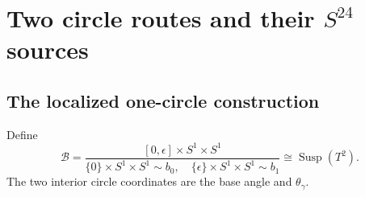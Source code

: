 \documentclass[11pt,letterpaper]{article}
\numberwithin{equation}{section}
\theoremstyle{definition}
\theoremstyle{remark}
\newcommand{\Susp}{\operatorname{Susp}}
\begin{document}
\section{Two circle routes and their \texorpdfstring{$S^{24}$}{S24} sources}

\subsection{The localized one-circle construction}

Define
\begin{equation}
 \mathcal B=
 \frac{[0,\epsilon]\times S^1\times S^1}
 {\{0\}\times S^1\times S^1\sim b_0,
  \quad\{\epsilon\}\times S^1\times S^1\sim b_1}
 \cong\Susp(T^2).
 \label{eq:B-definition}
\end{equation}
The two interior circle coordinates are the base angle and
$\theta_\gamma$.
\end{document}
